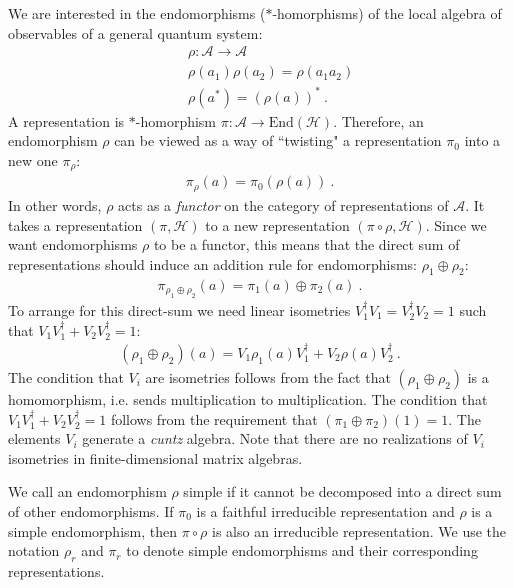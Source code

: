 \documentclass{article}
\newcommand{\mA}{\mathcal{A}}
\newcommand{\nn}{\nonumber}
\theoremstyle{definition}
\begin{document}
  We are interested in the endomorphisms ($*$-homorphisms) of the local algebra of
  observables of a general quantum system:
  \begin{eqnarray}
    &&\rho:\mathcal{A}\to \mathcal{A}\nn\\
    &&\rho(a_1)\rho(a_2)=\rho(a_1a_2)\nn\\
    &&\rho(a^*)=(\rho(a))^*\ .
  \end{eqnarray}
  A representation is $*$-homorphism $\pi:\mA\to \mathrm{End}(\mathcal{H})$. Therefore,
  an endomorphism $\rho$ can be viewed as a way of ``twisting" a representation $\pi
  _{0}$ into a new one $\pi_{\rho}$:
  \begin{eqnarray}
    \pi_\rho(a)=\pi_0(\rho(a))\ .
  \end{eqnarray}
  In other words, $\rho$ acts as a {\it functor} on the category of representations
  of $\mA$. It takes a representation $(\pi,\mathcal{H})$ to a new
  representation $(\pi\circ\rho,\mathcal{H})$. Since we want endomorphisms $\rho$
  to be a functor, this means that the direct sum of representations should
  induce an addition rule for endomorphisms: $\rho_{1}\oplus \rho_{2}$:
  \begin{eqnarray}
    \pi_{\rho_1\oplus \rho_2}(a)=\pi_1(a)\oplus\pi_2(a)\ .
  \end{eqnarray}
  To arrange for this direct-sum we need linear isometries
  $V_{1}^{\dagger}V_{1}= V_{2}^{\dagger}V_{2}=1$ such that
  $V_{1}V_{1}^{\dagger}+V_{2}V_{2}^{\dagger}=1$:
  \begin{eqnarray}
    (\rho_1\oplus\rho_2)(a)=V_1\rho_1(a)V_1^\dagger+V_2\rho(a)V_2^\dagger\ .
  \end{eqnarray}
  The condition that $V_{i}$ are isometries follows from the fact that $(\rho_{1}
  \oplus\rho_{2})$ is a homomorphism, i.e. sends multiplication to multiplication.
  The condition that $V_{1}V_{1}^{\dagger}+V_{2}V_{2}^{\dagger}=1$ follows from
  the requirement that $(\pi_{1}\oplus\pi_{2})(1)=1$. The elements $V_{i}$ generate
  a {\it cuntz} algebra. Note that there are no realizations of $V_{i}$
  isometries in finite-dimensional matrix algebras.

  We call an endomorphism $\rho$ simple if it cannot be decomposed into a direct
  sum of other endomorphisms. If $\pi_{0}$ is a faithful irreducible representation
  and $\rho$ is a simple endomorphism, then $\pi\circ \rho$ is also an
  irreducible representation. We use the notation $\rho_{r}$ and $\pi_{r}$ to denote
  simple endomorphisms and their corresponding representations.
\end{document}
